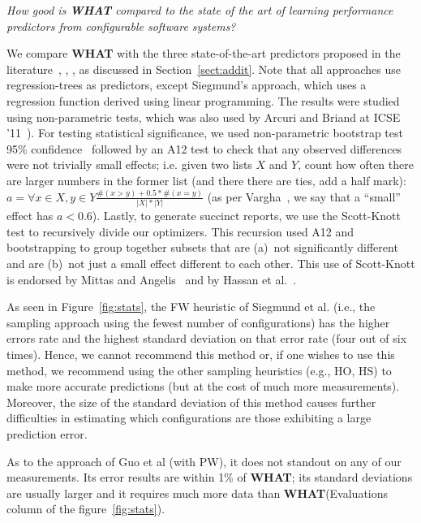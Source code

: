 \documentclass[smallextended]{svjour3}       %
\newcommand{\what}{{\bf WHAT}\xspace}
\begin{document}

 \begin{center}
{\em How good is \what compared to the state of the art of learning performance predictors from configurable software systems?}
\end{center}

We compare \what with the three state-of-the-art predictors proposed in the literature~\cite{siegmund2012predicting}, \cite{guo2013variability}, \cite{sarkar2015cost}, as discussed in Section~\ref{sect:addit}. Note that all approaches use regression-trees as predictors, except Siegmund's approach, which uses a regression function derived using linear programming.
The results were studied using non-parametric tests, which was also used by Arcuri and Briand at ICSE
'11~\cite{mittas13}). For testing statistical significance,
we used non-parametric bootstrap test 95\% confidence~\cite{efron93} followed by
an A12 test to check that any observed differences were not trivially small effects;
i.e. given two lists $X$ and $Y$, count how often there are larger
numbers in the former list (and there there are ties, add a half mark):
$a=\forall x\in X, y\in Y\frac{\#(x>y) + 0.5*\#(x=y)}{|X|*|Y|}$
(as per Vargha~\cite{Vargha00}, we say that a ``small'' effect has $a <0.6$). 
Lastly, to generate succinct reports, we use the Scott-Knott test to recursively
divide our optimizers. This recursion used A12 and bootstrapping  
to group together subsets that are (a)~not significantly different and are (b)~not
just a small effect different to each other. This use of Scott-Knott is endorsed
by Mittas and Angelis~\cite{mittas13}
and by Hassan et al.~\cite{7194626}.

As seen in Figure~\ref{fig:stats}, the FW heuristic of Siegmund et al. (i.e., the sampling approach using the fewest number of configurations)  has the higher errors rate and the highest standard deviation on that error rate (four out of six times). Hence, we cannot recommend this method or, if one wishes to use this method, we recommend using the other sampling heuristics (e.g., HO, HS) to make more accurate predictions (but at the cost of much more measurements). Moreover, the size of the standard deviation of this method causes further difficulties in estimating which configurations are those exhibiting a large prediction error. 


As to the approach of Guo et al (with PW), it does not standout on any of our measurements. Its error results are within 1\% of \what; its standard deviations are usually larger and it requires much more data than \what (Evaluations column of the figure~\ref{fig:stats}). 
\end{document}
